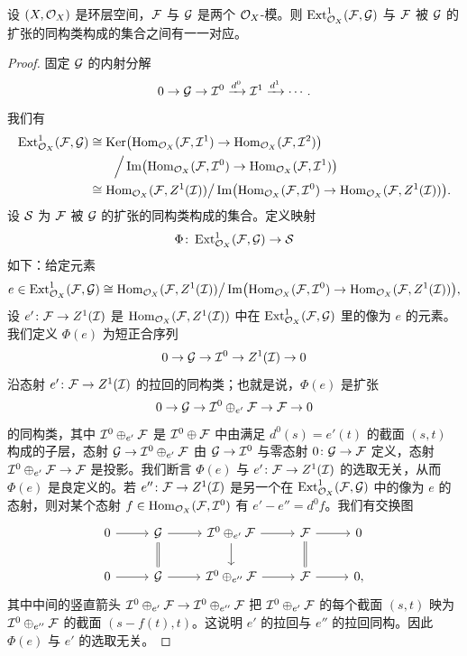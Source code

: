 \begin{proposition}\label{it:2.1.15}
设 $(X,\cO_X)$ 是环层空间，$\cF$ 与 $\cG$ 是两个 $\cO_X$-模。则 $\Ext^1_{\cO_X}(\cF,\cG)$ 与 $\cF$ 被 $\cG$ 的扩张的同构类构成的集合之间有一一对应。
\end{proposition}
\begin{proof}
固定 $\cG$ 的内射分解
\[
0\to\cG\to\cI^0\xrightarrow{d^0}\cI^1\xrightarrow{d^1}\cdots.
\]
我们有
\[
\begin{aligned}
\Ext^1_{\cO_X}(\cF,\cG)
&\cong\Ker\bigl(\Hom_{\cO_X}(\cF,\cI^1)\to\Hom_{\cO_X}(\cF,\cI^2)\bigr)\\
&\qquad\Big/\Image\bigl(\Hom_{\cO_X}(\cF,\cI^0)\to\Hom_{\cO_X}(\cF,\cI^1)\bigr)\\
&\cong\Hom_{\cO_X}(\cF,Z^1(\cI))\big/\Image\bigl(\Hom_{\cO_X}(\cF,\cI^0)\to\Hom_{\cO_X}(\cF,Z^1(\cI))\bigr).
\end{aligned}
\]
设 $\cS$ 为 $\cF$ 被 $\cG$ 的扩张的同构类构成的集合。定义映射
\[
\Phi\colon\Ext^1_{\cO_X}(\cF,\cG)\to\cS
\]
如下：给定元素
\[
e\in\Ext^1_{\cO_X}(\cF,\cG)\cong\Hom_{\cO_X}(\cF,Z^1(\cI))\big/\Image\bigl(\Hom_{\cO_X}(\cF,\cI^0)\to\Hom_{\cO_X}(\cF,Z^1(\cI))\bigr),
\]
设 $e'\colon\cF\to Z^1(\cI)$ 是 $\Hom_{\cO_X}(\cF,Z^1(\cI))$ 中在 $\Ext^1_{\cO_X}(\cF,\cG)$ 里的像为 $e$ 的元素。我们定义 $\Phi(e)$ 为短正合序列
\[
0\to\cG\to\cI^0\to Z^1(\cI)\to 0
\]
沿态射 $e'\colon\cF\to Z^1(\cI)$ 的拉回的同构类；也就是说，$\Phi(e)$ 是扩张
\[
0\to\cG\to\cI^0\oplus_{e'}\cF\to\cF\to 0
\]
的同构类，其中 $\cI^0\oplus_{e'}\cF$ 是 $\cI^0\oplus\cF$ 中由满足 $d^0(s)=e'(t)$ 的截面 $(s,t)$ 构成的子层，态射 $\cG\to\cI^0\oplus_{e'}\cF$ 由 $\cG\to\cI^0$ 与零态射 $0\colon\cG\to\cF$ 定义，态射 $\cI^0\oplus_{e'}\cF\to\cF$ 是投影。我们断言 $\Phi(e)$ 与 $e'\colon\cF\to Z^1(\cI)$ 的选取无关，从而 $\Phi(e)$ 是良定义的。若 $e''\colon\cF\to Z^1(\cI)$ 是另一个在 $\Ext^1_{\cO_X}(\cF,\cG)$ 中的像为 $e$ 的态射，则对某个态射 $f\in\Hom_{\cO_X}(\cF,\cI^0)$ 有 $e'-e''=d^0f$。我们有交换图
\[\begin{tikzcd}[column sep=2.6em,row sep=1.8em]
0 \arrow[r] & \cG \arrow[r] \arrow[d,equal] & \cI^0\oplus_{e'}\cF \arrow[r] \arrow[d] & \cF \arrow[r] \arrow[d,equal] & 0 \\
0 \arrow[r] & \cG \arrow[r] & \cI^0\oplus_{e''}\cF \arrow[r] & \cF \arrow[r] & 0,
\end{tikzcd}\]
其中中间的竖直箭头 $\cI^0\oplus_{e'}\cF\to\cI^0\oplus_{e''}\cF$ 把 $\cI^0\oplus_{e'}\cF$ 的每个截面 $(s,t)$ 映为 $\cI^0\oplus_{e''}\cF$ 的截面 $(s-f(t),t)$。这说明 $e'$ 的拉回与 $e''$ 的拉回同构。因此 $\Phi(e)$ 与 $e'$ 的选取无关。


\end{proof}

